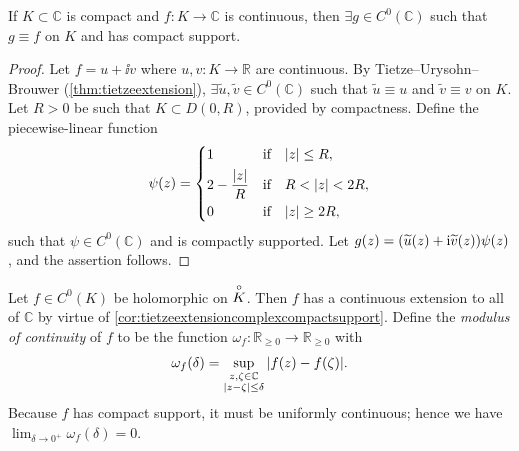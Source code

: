 \begin{corollary}\label{cor:tietzeextensioncomplexcompactsupport}
    If \(K\subset\mathbb{C}\) is compact and \(f:K\to\mathbb{C}\) is continuous, then \(\exists g\in C^0(\mathbb{C})\) such that \(g\equiv f\) on \(K\) and has compact support.
\end{corollary}
\begin{proof}
    Let \(f=u+\ii v\) where \(u,v:K\to\mathbb{R}\) are continuous. By Tietze--Urysohn--Brouwer (\cref{thm:tietzeextension}), \(\exists\widetilde{u},\widetilde{v}\in C^0(\mathbb{C})\) such that \(\widetilde{u}\equiv u\) and \(\widetilde{v}\equiv v\) on \(K\). Let \(R>0\) be such that \(K\subset D(0,R)\), provided by compactness. Define the piecewise-linear function \[\psi(z)=
        \begin{dcases}
            1                   & \qif*\abs{z}\leq R,  \\
            2-\frac{\abs{z}}{R} & \qif*R<\abs{z}<2R,   \\
            0                   & \qif*\abs{z}\geq 2R,
    \end{dcases}\] such that \(\psi\in C^0(\mathbb{C})\) and is compactly supported. Let \(g(z)=\qty(\widetilde{u}(z)+\mathrm{i}\widetilde{v}(z))\psi(z)\), and the assertion follows.
\end{proof}
Let \(f\in C^0(K)\) be holomorphic on \(\overset{\circ}{K}\). Then \(f\) has a continuous extension to all of \(\mathbb{C}\) by virtue of \cref{cor:tietzeextensioncomplexcompactsupport}. Define the \textit{modulus of continuity} of \(f\) to be the function \(\omega_f:\mathbb{R}_{\geq0}\to\mathbb{R}_{\geq0}\) with \[\omega_f(\delta)=\sup_{\substack{z,\zeta\in\mathbb{C}\\\abs{z-\zeta}\leq\delta}}\abs{f(z)-f(\zeta)}.\]
Because \(f\) has compact support, it must be uniformly continuous; hence we have \(\lim_{\delta\to0^+}\omega_f (\delta)=0\).

